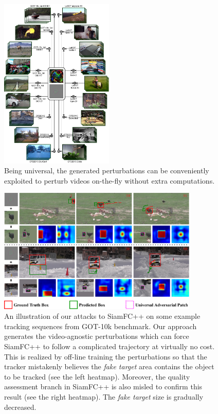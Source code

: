 \documentclass[journal]{IEEEtran}
\begin{document}
\begin{figure}[t]
  \centering
  \includegraphics[width=0.48\textwidth]{images/UAP.pdf}
  \caption{Being universal, the generated perturbations can be conveniently exploited to perturb videos on-the-fly without extra computations.} 
  \label{fig:UAP}
\end{figure}

\begin{figure}[t]
  \centering
  \includegraphics[width=0.85\textwidth]{images/1_v8.pdf}
  \caption{An illustration of our attacks to SiamFC++ on some example tracking sequences from GOT-10k benchmark. Our approach generates the video-agnostic perturbations which can force SiamFC++ to follow a complicated trajectory at virtually no cost. This is realized by off-line training the perturbations so that the tracker mistakenly believes the \textit{fake target} area contains the object to be tracked (see the left heatmap). Moreover, the quality assessment branch in SiamFC++ is also misled to confirm this result (see the right heatmap). The \textit{fake target} size is gradually decreased.} 
  \label{fig:1}
\end{figure}
\end{document}
